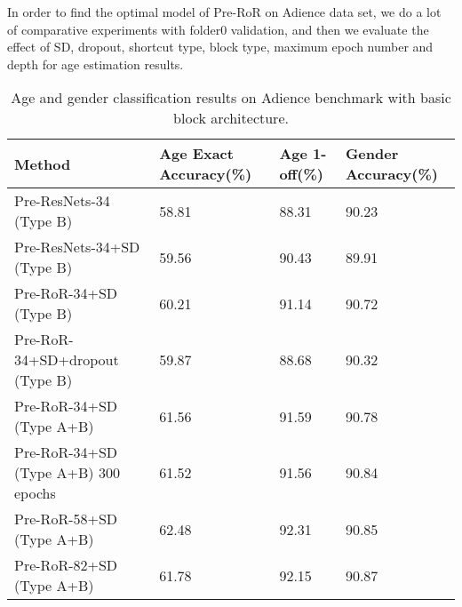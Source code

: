 \documentclass[journal]{IEEEtran}
\begin{document}
In order to find the optimal model of Pre-RoR on Adience data set, we do a lot of comparative experiments with folder0 validation, and then we evaluate the effect of SD, dropout, shortcut type, block type, maximum epoch number and depth for age estimation results.
\par 
\begin{table}[h]
\caption{Age and gender classification results on Adience benchmark with basic block architecture.}
\centering
\begin{tabular}{|p{2.9cm}|p{1.4cm}|p{1.1cm}|p{1.4cm}|}
\hline
Method  &Age Exact Accuracy(\%)  &Age 1-off(\%) &Gender Accuracy(\%)  \\ 
\hline\hline
Pre-ResNets-34 (Type B)       &58.81  &88.31  &90.23  \\
\hline
Pre-ResNets-34+SD (Type B)    &59.56  &90.43  &89.91  \\
\hline
Pre-RoR-34+SD (Type B)      &60.21  &91.14  &90.72  \\
\hline
Pre-RoR-34+SD+dropout (Type B)    &59.87  &88.68  &90.32  \\
\hline
Pre-RoR-34+SD  (Type A+B)       &61.56  &91.59  &90.78  \\
\hline
Pre-RoR-34+SD  (Type A+B) 300 epochs  &61.52  &91.56  &90.84  \\
\hline
Pre-RoR-58+SD (Type A+B)    &62.48  &92.31  &90.85  \\
\hline
Pre-RoR-82+SD (Type A+B)    &61.78  &92.15  &90.87  \\
\hline
\end{tabular}

\label{tab:tab7}
\end{table}
\end{document}
